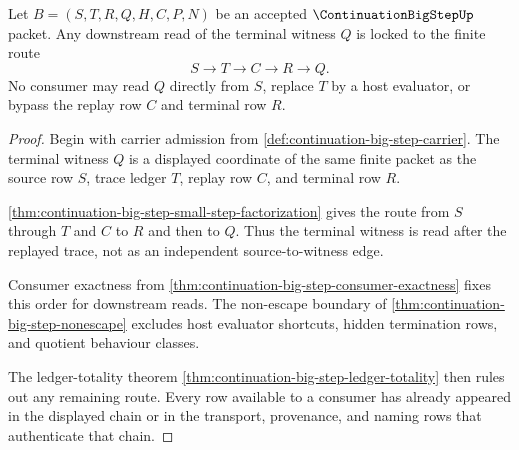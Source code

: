 \begin{theorem}
\label{thm:continuation-bigstep-root-trace-route-lock}
Let $B=(S,T,R,Q,H,C,P,N)$ be an accepted $\ContinuationBigStepUp$ packet. Any downstream read of the terminal witness $Q$ is locked to the finite route
$$
S \longrightarrow T \longrightarrow C \longrightarrow R \longrightarrow Q.
$$
No consumer may read $Q$ directly from $S$, replace $T$ by a host evaluator, or bypass the replay row $C$ and terminal row $R$.
\end{theorem}
\begin{proof}
Begin with carrier admission from \autoref{def:continuation-big-step-carrier}. The terminal witness $Q$ is a displayed coordinate of the same finite packet as the source row $S$, trace ledger $T$, replay row $C$, and terminal row $R$.

\autoref{thm:continuation-big-step-small-step-factorization} gives the route from $S$ through $T$ and $C$ to $R$ and then to $Q$. Thus the terminal witness is read after the replayed trace, not as an independent source-to-witness edge.

Consumer exactness from \autoref{thm:continuation-big-step-consumer-exactness} fixes this order for downstream reads. The non-escape boundary of \autoref{thm:continuation-big-step-nonescape} excludes host evaluator shortcuts, hidden termination rows, and quotient behaviour classes.

The ledger-totality theorem \autoref{thm:continuation-big-step-ledger-totality} then rules out any remaining route. Every row available to a consumer has already appeared in the displayed chain or in the transport, provenance, and naming rows that authenticate that chain.
\end{proof}

